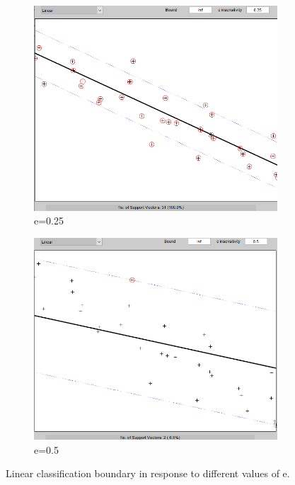 \documentclass{article}
\begin{document}
        \begin{figure}[h]
             \centering
             \hspace{0.05\textwidth}
             \begin{subfigure}[b]{0.4\textwidth}
                 \centering
                 \includegraphics[width=\textwidth]{Assignment 2/figures/1_1/linear_b_inf_e_0_25.png}
                 \caption{e=0.25}
                 \label{fig:linear_small_e}
             \end{subfigure}
             \hfill
             \begin{subfigure}[b]{0.4\textwidth}
                 \centering
                 \includegraphics[width=\textwidth]{Assignment 2/figures/1_1/linear_b_inf_e_0_5.png}
                 \caption{e=0.5}
                 \label{fig:linear_large_e}
             \end{subfigure}
             \hspace{0.05\textwidth}
            \caption{Linear classification boundary in response to different values of e. }
        \end{figure}
        
\end{document}
